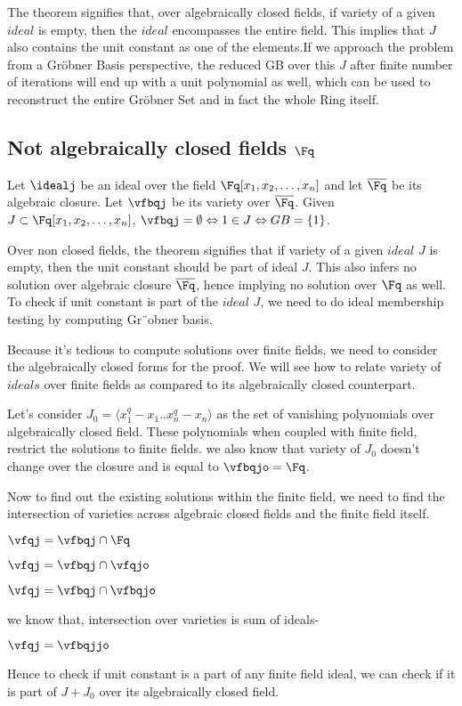 The theorem signifies that, over algebraically closed fields, if variety of a given $ideal$ is empty, then the $ideal $ encompasses the entire field. This implies that $J$ also contains the unit constant as one of the elements.If we approach the problem from a Gr\"obner Basis perspective, the reduced GB over this $J$ after finite number of iterations will end up with a unit polynomial as well, which can be used to reconstruct the entire Gr\"obner Set and in fact the whole Ring itself.
\subsection{ Not algebraically closed fields $\Fq$}
\begin{Theorem}
Let $\idealj$ be an ideal over the field $\Fq[x_1,x_2,\dots,x_n]$ and let $\overline{\Fq}$ be its algebraic closure. Let $\vfbqj$ be its variety over $\overline{\Fq}$. Given $J\subset\Fq[x_1,x_2,\dots,x_n]$, $\vfbqj=\emptyset \Leftrightarrow 1\in J \Leftrightarrow GB=\{1\}$.
\end{Theorem}

Over non closed fields, the theorem signifies that if variety of a given $ideal$ $J$ is empty, then the unit constant should be part of ideal $J$. This also infers no solution over algebraic closure $\overline{\Fq}$, hence implying no solution over $\Fq$ as well. To check if unit constant is part of the $ideal$ $J$, we need to do ideal membership testing by computing Gr¨obner basis.

Because it's tedious to compute solutions over finite fields, we need to consider the algebraically closed forms for the proof. We will see how to relate variety of $ideals$ over finite fields as compared to its algebraically closed counterpart.

Let's consider $J_0 = \langle x_1^q-x_1..x_n^q-x_n \rangle$ as the set of vanishing polynomials over algebraically closed field. These polynomials when coupled with finite field, restrict the solutions to finite fields. we also know that variety of $J_0$ doesn't change over the closure and is equal to $\vfbqjo= \Fq$.

Now to find out the existing solutions within the finite field, we need to find the intersection of varieties across algebraic closed fields and the finite field itself.

\quad \quad \quad $\vfqj = \vfbqj \cap \Fq$

\quad \quad \quad $\vfqj = \vfbqj \cap \vfqjo$

\quad \quad \quad $\vfqj = \vfbqj \cap \vfbqjo$

we know that, intersection over varieties is sum of ideals-

\quad \quad \quad $\vfqj = \vfbqjjo$

Hence to check if unit constant is a part of any finite field ideal, we can check if it is part of $J+J_0$ over its algebraically closed field.